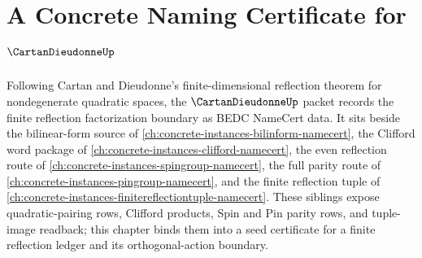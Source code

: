 \chapter{A Concrete Naming Certificate for $\CartanDieudonneUp$}
\label{ch:concrete-instances-cartan-dieudonne-namecert}

Following Cartan and Dieudonne's finite-dimensional reflection theorem for nondegenerate quadratic spaces, the $\CartanDieudonneUp$ packet records the finite reflection factorization boundary as BEDC NameCert data. It sits beside the bilinear-form source of \autoref{ch:concrete-instances-bilinform-namecert}, the Clifford word package of \autoref{ch:concrete-instances-clifford-namecert}, the even reflection route of \autoref{ch:concrete-instances-spingroup-namecert}, the full parity route of \autoref{ch:concrete-instances-pingroup-namecert}, and the finite reflection tuple of \autoref{ch:concrete-instances-finitereflectiontuple-namecert}. These siblings expose quadratic-pairing rows, Clifford products, Spin and Pin parity rows, and tuple-image readback; this chapter binds them into a seed certificate for a finite reflection ledger and its orthogonal-action boundary.

